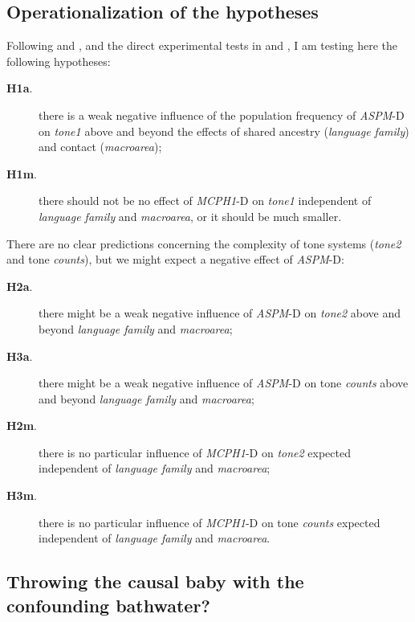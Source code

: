\documentclass[twoside,onecolumn]{article}
\begin{document}
\subsection{Operationalization of the hypotheses}

Following \citet{dediu_ladd_2007} and \citet{ladd_bioling_2008}, and the direct experimental tests in \citet{wong_plosone_2012} and \citet{wong_sciadv_2020}, I am testing here the following hypotheses:

\begin{description}
  \item[\textbf{H1a}.] there is a weak negative influence of the population frequency of \textit{ASPM}-D on \textit{tone1} above and beyond the effects of shared ancestry (\textit{language family}) and contact (\textit{macroarea});
  \item[\textbf{H1m}.] there should not be no effect of \textit{MCPH1}-D on \textit{tone1} independent of \textit{language family} and \textit{macroarea}, or it should be much smaller.
\end{description}

There are no clear predictions concerning the complexity of tone systems (\textit{tone2} and tone \textit{counts}), but we might expect a negative effect of \textit{ASPM}-D:

\begin{description}
  \item[\textbf{H2a}.] there might be a weak negative influence of \textit{ASPM}-D on \textit{tone2} above and beyond \textit{language family} and \textit{macroarea};
  \item[\textbf{H3a}.] there might be a weak negative influence of \textit{ASPM}-D on tone \textit{counts} above and beyond \textit{language family} and \textit{macroarea};
  \item[\textbf{H2m}.] there is no particular influence of \textit{MCPH1}-D on \textit{tone2} expected independent of \textit{language family} and \textit{macroarea};
  \item[\textbf{H3m}.] there is no particular influence of \textit{MCPH1}-D on tone \textit{counts} expected independent of \textit{language family} and \textit{macroarea}.
\end{description}


\subsection{Throwing the causal baby with the confounding bathwater?}
\end{document}
